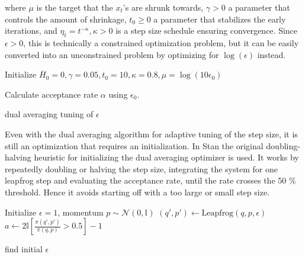 \documentclass[]{report}
\begin{document}
where $\mu$ is the target that the $x_t$'s are shrunk towards, $\gamma > 0$ a
parameter that controls the amount of shrinkage, $t_0 \ge 0$ a parameter that
stabilizes the early iterations, and $\eta_t = t^{-\kappa},\kappa>0$ is a
step size schedule ensuring convergence. Since $\epsilon>0$, this is technically
a constrained optimization problem, but it can be easily converted into an
unconstrained problem by optimizing for $\log(\epsilon)$ instead. 

\begin{algorithm}

Initialize $\overline{H}_0 = 0, \gamma = 0.05, t_0 = 10 ,\kappa = 0.8 , \mu = \log(10\epsilon_0)$ \;
	
	Calculate acceptance rate $\alpha$ using $\epsilon_0$. \;

\caption{dual averaging tuning of $\epsilon$ }
\end{algorithm}

Even with the dual averaging algorithm for adaptive tuning of the step size, it is still an optimization that requires an initialization. In Stan the original doubling-halving heuristic for initializing the dual averaging optimizer is used. It works by repeatedly doubling or halving the step size, integrating the system for one leapfrog step and evaluating the acceptance rate, until the rate crosses the 50 \% threshold. Hence it avoids starting off with a too large or small step size. 
\begin{algorithm}
Initialize $\epsilon = 1$, momentum $p \sim \mathcal{N}(0,\mathbb{I}) $ \;
$(q',p') \leftarrow \text{Leapfrog}(q,p,\epsilon) $ \;
$a \leftarrow 2 \mathbb{I}[ \frac{\pi(q',p')}{\pi(q,p)} > 0.5 ] -1 $\;
\KwRet{$\epsilon$}
\caption{find initial $\epsilon$} 
\end{algorithm}
\end{document}
